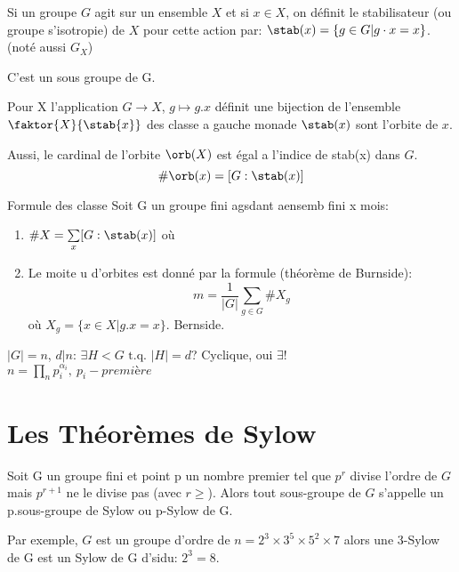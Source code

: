 \begin{definition}
	Si un groupe $G$ agit sur un ensemble $X$ et si $x\in X$, on définit le stabilisateur (ou groupe s'isotropie) de $X$ pour cette action par: $\stab(x)=\{g\in G | g\cdot x=x\}$. (noté aussi $G_X$)
\end{definition}

\begin{proposition}
	C'est un sous groupe de G. %
\end{proposition}

\begin{proposition} 
	Pour X l'application $G\rightarrow X$, $g\mapsto g.x$ définit une bijection de l'ensemble $\faktor{X}{\stab{x}}$ des classe a gauche monade $\stab(x)$ sont l'orbite de $x$.
\end{proposition}

Aussi, le cardinal de l'orbite $\orb(X)$ est égal a l'indice de stab(x) dans $G$.
$$\#\orb(x) =[G: \stab(x)]$$

\begin{theorem}{Formule des classe}
	Soit G un groupe fini agsdant aensemb fini x mois:
	\begin{enumerate}
		\item $\#X=\sum\limits_x[G: \stab(x)]$ où 
		\item Le moite u d'orbites est donné par la formule (théorème de Burnside):
		$$m=\frac{1}{|G|}\sum\limits_{g\in G}\#X_g$$
		où $X_g=\{x\in X | g.x=x\}$. Bernside.
	\end{enumerate}
\end{theorem}

\begin{remark}
	$|G|=n$, $d | n$: $\exists H<G \text{ t.q. } |H|=d$? Cyclique, oui $\exists !$\\
	$n=\prod\limits_n p_i^{\alpha_i},\ p_i - première$
\end{remark}

\section{Les Théorèmes de Sylow}

Soit G un groupe fini et point p un nombre premier tel que $p^r$ divise l'ordre de $G$ mais $p^{r+1}$ ne le divise pas (avec $r\geq$).
Alors tout sous-groupe de $G$ s'appelle un p.sous-groupe de Sylow ou p-Sylow de G.

Par exemple, $G$ est un groupe d'ordre de $n=2^3\times 3^5\times 5^2 \times 7$
alors une 3-Sylow de G est un Sylow de G d'sidu: $2^3=8$.

